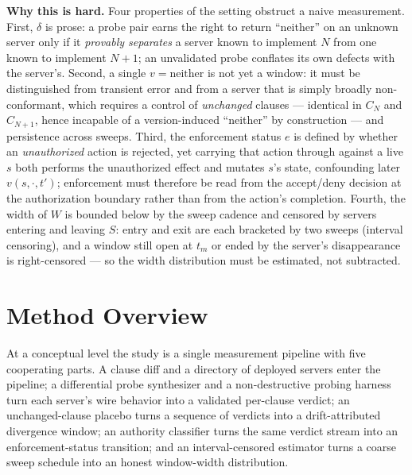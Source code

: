 \documentclass[11pt]{article}
\begin{document}
\textbf{Why this is hard.} Four properties of the setting obstruct a naive measurement. First, $\delta$ is prose: a probe pair earns the right to return ``neither'' on an unknown server only if it \emph{provably separates} a server known to implement $N$ from one known to implement $N{+}1$; an unvalidated probe conflates its own defects with the server's. Second, a single $v = \text{neither}$ is not yet a window: it must be distinguished from transient error and from a server that is simply broadly non-conformant, which requires a control of \emph{unchanged} clauses --- identical in $C_N$ and $C_{N+1}$, hence incapable of a version-induced ``neither'' by construction --- and persistence across sweeps. Third, the enforcement status $e$ is defined by whether an \emph{unauthorized} action is rejected, yet carrying that action through against a live $s$ both performs the unauthorized effect and mutates $s$'s state, confounding later $v(s, \cdot, t')$; enforcement must therefore be read from the accept/deny decision at the authorization boundary rather than from the action's completion. Fourth, the width of $W$ is bounded below by the sweep cadence and censored by servers entering and leaving $S$: entry and exit are each bracketed by two sweeps (interval censoring), and a window still open at $t_m$ or ended by the server's disappearance is right-censored --- so the width distribution must be estimated, not subtracted.

\section{Method Overview}

At a conceptual level the study is a single measurement pipeline with five cooperating parts. A clause diff and a directory of deployed servers enter the pipeline; a differential probe synthesizer and a non-destructive probing harness turn each server's wire behavior into a validated per-clause verdict; an unchanged-clause placebo turns a sequence of verdicts into a drift-attributed divergence window; an authority classifier turns the same verdict stream into an enforcement-status transition; and an interval-censored estimator turns a coarse sweep schedule into an honest window-width distribution.
\end{document}
